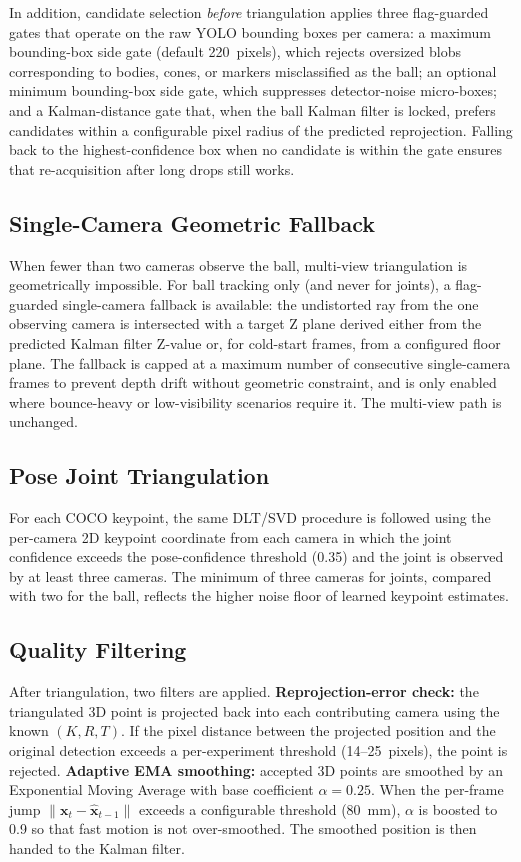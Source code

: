 In addition, candidate selection \emph{before} triangulation applies three flag-guarded gates that operate on the raw YOLO bounding boxes per camera: a maximum bounding-box side gate (default 220~pixels), which rejects oversized blobs corresponding to bodies, cones, or markers misclassified as the ball; an optional minimum bounding-box side gate, which suppresses detector-noise micro-boxes; and a Kalman-distance gate that, when the ball Kalman filter is locked, prefers candidates within a configurable pixel radius of the predicted reprojection. Falling back to the highest-confidence box when no candidate is within the gate ensures that re-acquisition after long drops still works.

\subsection{Single-Camera Geometric Fallback}

When fewer than two cameras observe the ball, multi-view triangulation is geometrically impossible. For ball tracking only (and never for joints), a flag-guarded single-camera fallback is available: the undistorted ray from the one observing camera is intersected with a target Z plane derived either from the predicted Kalman filter Z-value or, for cold-start frames, from a configured floor plane. The fallback is capped at a maximum number of consecutive single-camera frames to prevent depth drift without geometric constraint, and is only enabled where bounce-heavy or low-visibility scenarios require it. The multi-view path is unchanged.

\subsection{Pose Joint Triangulation}

For each COCO keypoint, the same DLT/SVD procedure is followed using the per-camera 2D keypoint coordinate from each camera in which the joint confidence exceeds the pose-confidence threshold (0.35) and the joint is observed by at least three cameras. The minimum of three cameras for joints, compared with two for the ball, reflects the higher noise floor of learned keypoint estimates.

\subsection{Quality Filtering}

After triangulation, two filters are applied. \textbf{Reprojection-error check:} the triangulated 3D point is projected back into each contributing camera using the known $(K, R, T)$. If the pixel distance between the projected position and the original detection exceeds a per-experiment threshold (14--25~pixels), the point is rejected. \textbf{Adaptive EMA smoothing:} accepted 3D points are smoothed by an Exponential Moving Average with base coefficient $\alpha = 0.25$. When the per-frame jump $\|\mathbf{x}_t - \hat{\mathbf{x}}_{t-1}\|$ exceeds a configurable threshold (80~mm), $\alpha$ is boosted to 0.9 so that fast motion is not over-smoothed. The smoothed position is then handed to the Kalman filter.

